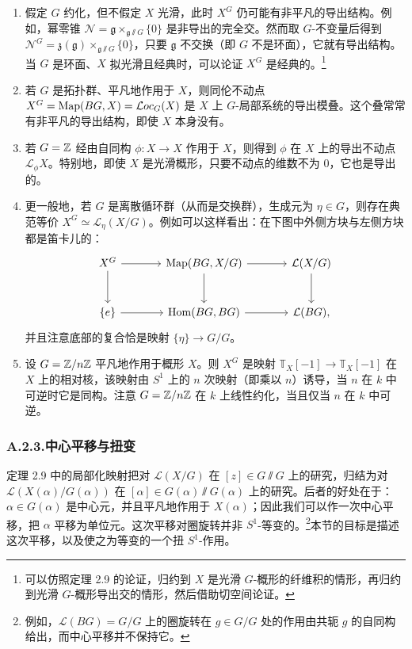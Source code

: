 
\begin{enumerate}[(1),start=3]
\item 假定 $G$ 约化，但不假定 $X$ 光滑，此时 $X^G$ 仍可能有非平凡的导出结构。例如，幂零锥 $\mathcal N=\mathfrak g\times_{\mathfrak g\sslash G}\{0\}$ 是非导出的完全交。然而取 $G$-不变量后得到 $\mathcal N^G=\mathfrak z(\mathfrak g)\times_{\mathfrak g\sslash G}\{0\}$，只要 $\mathfrak g$ 不交换（即 $G$ 不是环面），它就有导出结构。当 $G$ 是环面、$X$ 拟光滑且经典时，可以论证 $X^G$ 是经典的。\footnote{可以仿照定理 2.9 的论证，归约到 $X$ 是光滑 $G$-概形的纤维积的情形，再归约到光滑 $G$-概形导出交的情形，然后借助切空间论证。}
\item 若 $G$ 是拓扑群、平凡地作用于 $X$，则同伦不动点 $X^G=\operatorname{Map}(BG,X)=\mathcal Loc_G(X)$ 是 $X$ 上 $G$-局部系统的导出模叠。这个叠常常有非平凡的导出结构，即使 $X$ 本身没有。
\item 若 $G=\mathbb{Z}$ 经由自同构 $\phi:X\to X$ 作用于 $X$，则得到 $\phi$ 在 $X$ 上的导出不动点 $\mathcal L_\phi X$。特别地，即使 $X$ 是光滑概形，只要不动点的维数不为 $0$，它也是导出的。
\item 更一般地，若 $G$ 是离散循环群（从而是交换群），生成元为 $\eta\in G$，则存在典范等价 $X^G\simeq\mathcal L_\eta(X/G)$。例如可以这样看出：在下图中外侧方块与左侧方块都是笛卡儿的：
\[
\begin{tikzcd}[column sep=large,row sep=large]
X^G \arrow[r] \arrow[d] & \Map(BG,X/G) \arrow[r] \arrow[d] & \mathcal L(X/G) \arrow[d]\\
\{e\} \arrow[r] & \Hom(BG,BG) \arrow[r] & \mathcal L(BG),
\end{tikzcd}
\]
并且注意底部的复合恰是映射 $\{\eta\}\to G/G$。
\item 设 $G=\mathbb{Z}/n\mathbb{Z}$ 平凡地作用于概形 $X$。则 $X^G$ 是映射 $\mathbb T_X[-1]\to\mathbb T_X[-1]$ 在 $X$ 上的相对核，该映射由 $S^1$ 上的 $n$ 次映射（即乘以 $n$）诱导，当 $n$ 在 $k$ 中可逆时它是同构。注意 $G=\mathbb{Z}/n\mathbb{Z}$ 在 $k$ 上线性约化，当且仅当 $n$ 在 $k$ 中可逆。
\end{enumerate}

\subsubsection*{A.2.3.\quad 中心平移与扭变}

定理 2.9 中的局部化映射把对 $\mathcal L(X/G)$ 在 $[z]\in G\sslash G$ 上的研究，归结为对 $\mathcal L(X(\alpha)/G(\alpha))$ 在 $[\alpha]\in G(\alpha)\sslash G(\alpha)$ 上的研究。后者的好处在于：$\alpha\in G(\alpha)$ 是中心元，并且平凡地作用于 $X(\alpha)$；因此我们可以作一次中心平移，把 $\alpha$ 平移为单位元。这次平移对圈旋转并非 $S^1$-等变的。\footnote{例如，$\mathcal L(BG)=G/G$ 上的圈旋转在 $g\in G/G$ 处的作用由共轭 $g$ 的自同构给出，而中心平移并不保持它。}本节的目标是描述这次平移，以及使之为等变的一个扭 $S^1$-作用。

